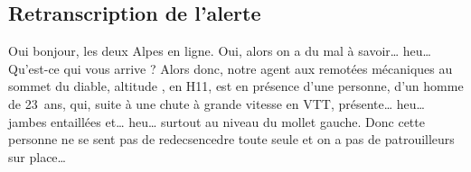 \subsection{Retranscription de l'alerte}
\begin{dialogue}
  \Req {} Oui bonjour, les deux Alpes en ligne.
  \Sec Oui, alors on a du mal à savoir… heu… Qu'est-ce qui vous arrive ?
  \Req Alors donc, notre agent aux remotées mécaniques au sommet du diable, altitude , en H11, est en présence d'une personne, d'un homme de 23~ans, qui, suite à une chute à grande vitesse en VTT, présente… heu… jambes entaillées et… heu… surtout au niveau du mollet gauche. Donc cette personne ne se sent pas de redecsencedre toute seule et on a pas de patrouilleurs sur place… 
\end{dialogue}

